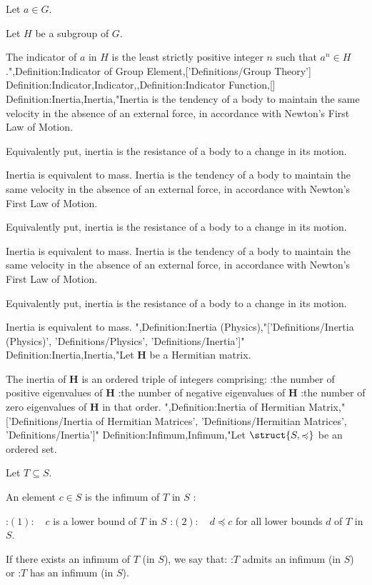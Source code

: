 Let $a \in G$.

Let $H$ be a subgroup of $G$.


The indicator of $a$ in $H$ is the least strictly positive integer $n$ such that $a^n \in H$.",Definition:Indicator of Group Element,['Definitions/Group Theory']
Definition:Indicator,Indicator,,Definition:Indicator Function,[]
Definition:Inertia,Inertia,"Inertia is the tendency of a body to maintain the same velocity in the absence of an external force, in accordance with Newton's First Law of Motion.

Equivalently put, inertia is the resistance of a body to a change in its motion.

Inertia is equivalent to mass.
Inertia is the tendency of a body to maintain the same velocity in the absence of an external force, in accordance with Newton's First Law of Motion.

Equivalently put, inertia is the resistance of a body to a change in its motion.

Inertia is equivalent to mass.
Inertia is the tendency of a body to maintain the same velocity in the absence of an external force, in accordance with Newton's First Law of Motion.

Equivalently put, inertia is the resistance of a body to a change in its motion.

Inertia is equivalent to mass.
",Definition:Inertia (Physics),"['Definitions/Inertia (Physics)', 'Definitions/Physics', 'Definitions/Inertia']"
Definition:Inertia,Inertia,"Let $\mathbf H$ be a Hermitian matrix.

The inertia of $\mathbf H$ is an ordered triple of integers comprising:
:the number of positive eigenvalues of $\mathbf H$
:the number of negative eigenvalues of $\mathbf H$
:the number of zero eigenvalues of $\mathbf H$
in that order.
",Definition:Inertia of Hermitian Matrix,"['Definitions/Inertia of Hermitian Matrices', 'Definitions/Hermitian Matrices', 'Definitions/Inertia']"
Definition:Infimum,Infimum,"Let $\struct {S, \preccurlyeq}$ be an ordered set.

Let $T \subseteq S$.


An element $c \in S$ is the infimum of $T$ in $S$ :

:$(1): \quad c$ is a lower bound of $T$ in $S$
:$(2): \quad d \preccurlyeq c$ for all lower bounds $d$ of $T$ in $S$.


If there exists an infimum of $T$ (in $S$), we say that:
:$T$ admits an infimum (in $S$) or
:$T$ has an infimum (in $S$).


